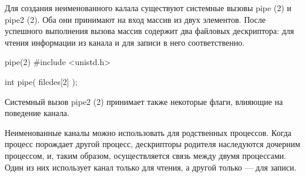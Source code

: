 Для создания неименованного калала существуют системные вызовы pipe (2) и pipe2 (2). Оба они принимают на вход массив из двух элементов. После успешного выполнения вызова массив содержит два файловых дескриптора: для чтения информации из канала и для записи в него соответственно. 

\begin{CCode}{pipe(2)}
	#include <unistd.h>
	
	int pipe(
		filedes[2]
	); \end{CCode}

Системный вызов pipe2 (2) принимает также некоторые флаги, влияющие на поведение канала.

Неименованные каналы можно использовать для родственных процессов. Когда процесс порождает другой процесс, дескрипторы родителя наследуются дочерним процессом, и, таким образом, осуществляется связь между двумя процессами. Один из них использует канал только для чтения, а другой только --- для записи.
